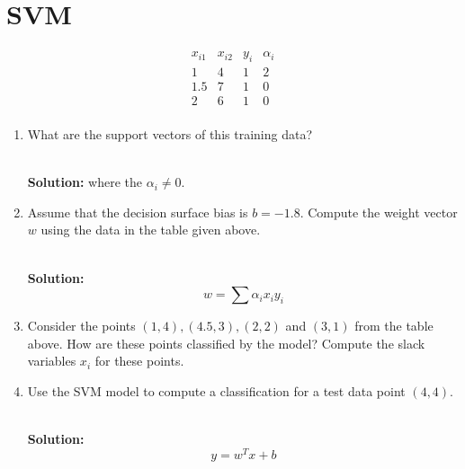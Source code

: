 
\section{SVM}

\[
\begin{matrix}
x_{i1} & x_{i2} & y_i & \alpha_i \\
1 & 4 & 1 & 2\\
1.5 & 7 & 1 & 0\\
2 & 6 & 1 & 0\\
\end{matrix}
\]
\begin{enumerate}
\item What are the support vectors of this training data?

\ \\{\bf Solution:} where the $\alpha_i\ne 0$.

\item Assume that the decision surface bias is $b=-1.8$. Compute the weight vector $w$ using the data in the table given above.

\ \\{\bf Solution:} 
\[ 
w = \sum \alpha_i x_iy_i
\]

\item Consider the points $(1,4),(4.5,3),(2,2)$ and $(3,1)$ from the table above. How are these points classified by the model? Compute the slack variables $x_i$ for these points.

\item Use the SVM model to compute a classification for a test data point $(4,4)$.

\ \\{\bf Solution:}
\[
y = w^Tx+b
\]
\end{enumerate}